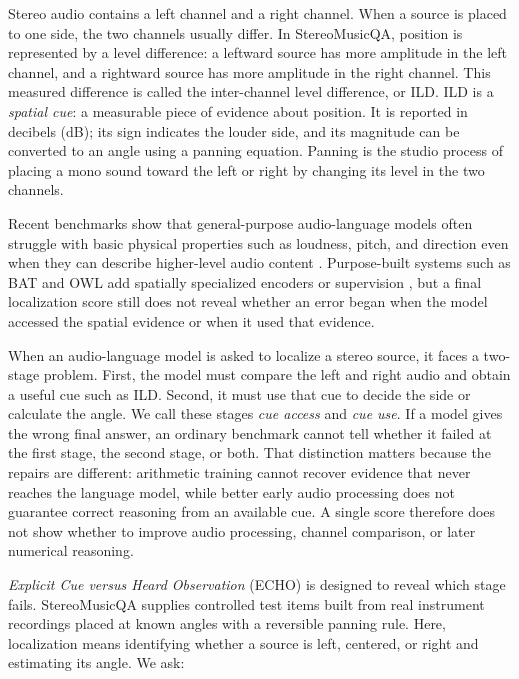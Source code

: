 \documentclass{article}
\begin{document}
Stereo audio contains a left channel and a right channel. When a source is placed to one side, the two channels usually differ. In StereoMusicQA, position is represented by a level difference: a leftward source has more amplitude in the left channel, and a rightward source has more amplitude in the right channel. This measured difference is called the inter-channel level difference, or ILD. ILD is a \emph{spatial cue}: a measurable piece of evidence about position. It is reported in decibels (dB); its sign indicates the louder side, and its magnitude can be converted to an angle using a panning equation. Panning is the studio process of placing a mono sound toward the left or right by changing its level in the two channels.

Recent benchmarks show that general-purpose audio-language models often struggle with basic physical properties such as loudness, pitch, and direction even when they can describe higher-level audio content \citep{gong2024avodyssey,sun2026sonicbench}. Purpose-built systems such as BAT and OWL add spatially specialized encoders or supervision \citep{zheng2024bat,biswas2025owl}, but a final localization score still does not reveal whether an error began when the model accessed the spatial evidence or when it used that evidence.

When an audio-language model is asked to localize a stereo source, it faces a two-stage problem. First, the model must compare the left and right audio and obtain a useful cue such as ILD. Second, it must use that cue to decide the side or calculate the angle. We call these stages \emph{cue access} and \emph{cue use}. If a model gives the wrong final answer, an ordinary benchmark cannot tell whether it failed at the first stage, the second stage, or both. That distinction matters because the repairs are different: arithmetic training cannot recover evidence that never reaches the language model, while better early audio processing does not guarantee correct reasoning from an available cue. A single score therefore does not show whether to improve audio processing, channel comparison, or later numerical reasoning.

\emph{Explicit Cue versus Heard Observation} (ECHO) is designed to reveal which stage fails. StereoMusicQA supplies controlled test items built from real instrument recordings placed at known angles with a reversible panning rule. Here, localization means identifying whether a source is left, centered, or right and estimating its angle. We ask:
\end{document}
